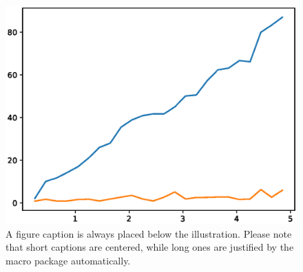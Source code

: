 \documentclass[runningheads]{llncs}
\begin{document}
\begin{figure}[H]
    \includegraphics[width=\textwidth]{EvsL1.eps}
    \caption{A figure caption is always placed below the illustration.
    Please note that short captions are centered, while long ones are
    justified by the macro package automatically.} \label{fig1}
\end{figure}



\end{document}
